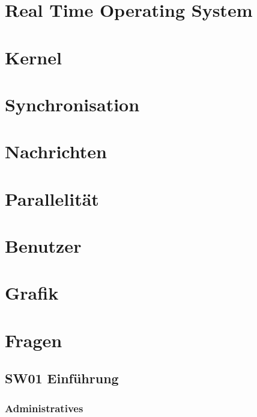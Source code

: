 \documentclass[
  10pt,
  a4paper,
]{article}
\numberwithin{equation}{section}
\begin{document}
\hypertarget{real-time-operating-system}{%
\section{\texorpdfstring{\textbf{R}eal \textbf{T}ime \textbf{O}perating
\textbf{S}ystem}{Real Time Operating System}}\label{real-time-operating-system}}

\hypertarget{kernel}{%
\section{Kernel}\label{kernel}}

\hypertarget{synchronisation}{%
\section{Synchronisation}\label{synchronisation}}

\hypertarget{nachrichten}{%
\section{Nachrichten}\label{nachrichten}}

\hypertarget{parallelituxe4t}{%
\section{Parallelität}\label{parallelituxe4t}}

\hypertarget{benutzer}{%
\section{Benutzer}\label{benutzer}}

\hypertarget{grafik}{%
\section{Grafik}\label{grafik}}

\hypertarget{fragen}{%
\section{Fragen}\label{fragen}}

\hypertarget{sw01-einfuxfchrung}{%
\subsection{SW01 Einführung}\label{sw01-einfuxfchrung}}

\hypertarget{administratives}{%
\subsubsection{Administratives}\label{administratives}}
\end{document}
